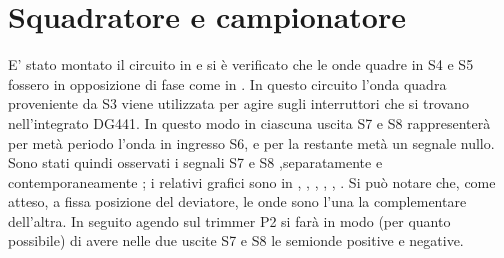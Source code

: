 \section{Squadratore e campionatore}
E' stato montato il circuito in  e si è verificato che le onde quadre in S4 e S5 fossero in opposizione di fase come in .
In questo circuito l'onda quadra proveniente da S3 viene utilizzata per agire sugli interruttori che si trovano nell'integrato DG441. In questo modo in ciascuna uscita S7 e S8 rappresenterà per metà periodo l'onda in ingresso S6, e per la restante metà un segnale nullo. 
Sono stati quindi osservati i segnali S7 e S8 ,separatamente e contemporaneamente ; i relativi grafici sono in , , , , , . Si può notare che, come atteso, a fissa posizione del deviatore, le onde sono l'una la complementare dell'altra. In seguito agendo sul trimmer P2 si farà in modo (per quanto possibile) di avere nelle due uscite S7 e S8 le semionde positive e negative.\\ 
